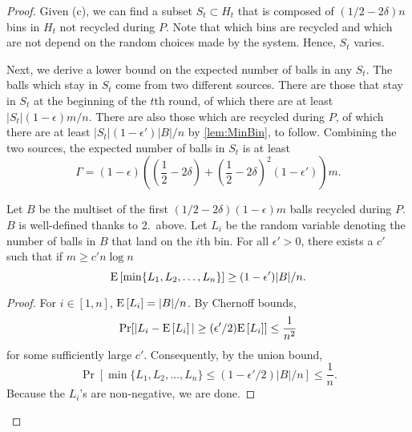 \begin{proof}
	Given (c), we can find a subset $S_t \subset H_t$ that is composed of
	$(1/2-2\delta)n$ bins in $H_t$ not recycled during $P$.  Note that which
	bins are recycled and which are not depend on the random choices made by the
	system. Hence, $S_t$ varies.  
		
	Next, we derive a lower bound on the expected number of balls in any $S_t$.
	The balls which stay in $S_t$ come from two different sources. There are
	those that stay in $S_t$ at the beginning of the $t$th round, of which
	there are at least $|S_t|(1-\epsilon)m/n$.  There are also those which are
	recycled during $P$, of which there are at least
	$|S_t|(1-\epsilon')|B|/n$ by \cref{lem:MinBin}, to follow.  Combining the
	two sources, the expected number of balls in $S_t$ is at least
	\begin{equation*}
		\Gamma = (1-\epsilon)\left( \left(\frac{1}{2}-2\delta\right) +
		\left(\frac{1}{2}-2\delta\right)^2(1-\epsilon')\right)m.
	\end{equation*}

	\begin{lemma}\label{lem:MinBin}
	Let $B$ be the multiset of the first $(1/2-2\delta)(1-\epsilon)m$ balls
	recycled during $P$. $B$ is well-defined thanks to 2.\ above. Let $L_i$ be
	the random variable denoting the number of balls in $B$ that land on the
	$i$th bin. For all $\epsilon' > 0$, there exists a $c'$ such
        that if $m \ge c' n \log n$
		\begin{equation*}
			\mathrm{E}\left[\min\{L_1, L_2, \ldots, L_n\}\right] \ge (1-\epsilon')|B|/n.
		\end{equation*}
	\end{lemma}
	\begin{proof}
		For $i \in [1,n]$, $\mathrm{E}\left[L_i\right] = |B|/n$.
		By Chernoff bounds, 
		$$
			\Pr[|L_i-\mathrm{E}\left[L_i\right]| \ge (\epsilon'/2) \mathrm{E}\left[L_i\right]] \le \frac{1}{n^2} 
		$$
		for some sufficiently large $c'$. Consequently, by the union bound,
		$$
			\Pr[\min\{L_1, L_2, \ldots, L_n\} \le (1-\epsilon'/2)|B|/n] \le \frac{1}{n}.
		$$
		Because the $L_i$'s are non-negative, we are done. 
	\end{proof}


\end{proof}
